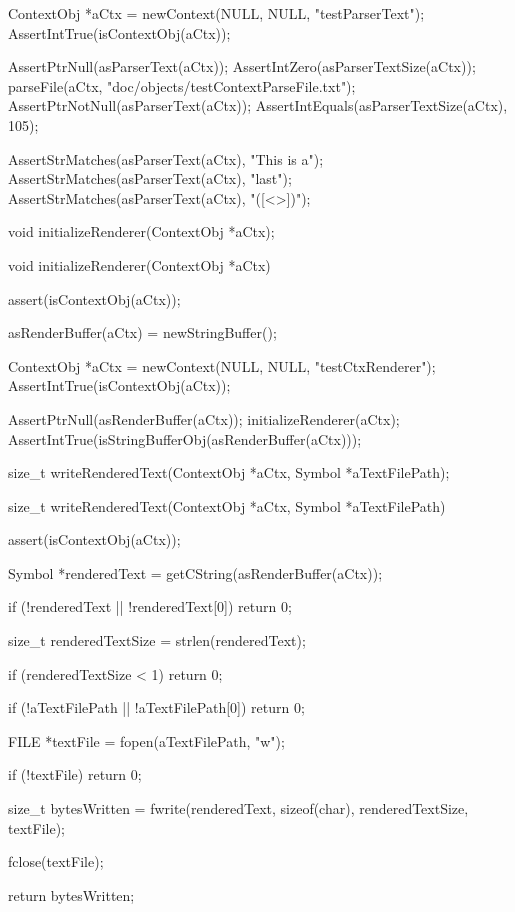 
\startCTest
  ContextObj *aCtx = newContext(NULL, NULL, "testParserText");
  AssertIntTrue(isContextObj(aCtx));
  
  AssertPtrNull(asParserText(aCtx));
  AssertIntZero(asParserTextSize(aCtx));
  parseFile(aCtx, "doc/objects/testContextParseFile.txt");
  AssertPtrNotNull(asParserText(aCtx));
  AssertIntEquals(asParserTextSize(aCtx), 105);
  
  AssertStrMatches(asParserText(aCtx), "This is a");
  AssertStrMatches(asParserText(aCtx), "last");
  AssertStrMatches(asParserText(aCtx), "([<{}>])");
\stopCTest
\stopTestCase
\stopTestSuite

\startTestSuite[initializeRenderer]

\startCHeader
void initializeRenderer(ContextObj *aCtx);
\stopCHeader

\startCCode
void initializeRenderer(ContextObj *aCtx) {
  assert(isContextObj(aCtx));
  
  asRenderBuffer(aCtx) = newStringBuffer();
}
\stopCCode


\startCTest
  ContextObj *aCtx = newContext(NULL, NULL, "testCtxRenderer");
  AssertIntTrue(isContextObj(aCtx));
  
  AssertPtrNull(asRenderBuffer(aCtx));
  initializeRenderer(aCtx);
  AssertIntTrue(isStringBufferObj(asRenderBuffer(aCtx)));
\stopCTest
\stopTestCase
\stopTestSuite

\startTestSuite[writeRenderedText]

\startCHeader
size_t writeRenderedText(ContextObj *aCtx, Symbol *aTextFilePath);
\stopCHeader

\startCCode
size_t writeRenderedText(ContextObj *aCtx, Symbol *aTextFilePath) {
  assert(isContextObj(aCtx));

  Symbol *renderedText = getCString(asRenderBuffer(aCtx));
  
  if (!renderedText || !renderedText[0]) return 0;
  
  size_t renderedTextSize = strlen(renderedText);

  if (renderedTextSize < 1) return 0;
  
  if (!aTextFilePath || !aTextFilePath[0]) return 0;
  
  FILE *textFile = fopen(aTextFilePath, "w");
  
  if (!textFile) return 0;

  size_t bytesWritten =
    fwrite(renderedText, sizeof(char), renderedTextSize, textFile);
  
  fclose(textFile);
  
  return bytesWritten;
}
\stopCCode

